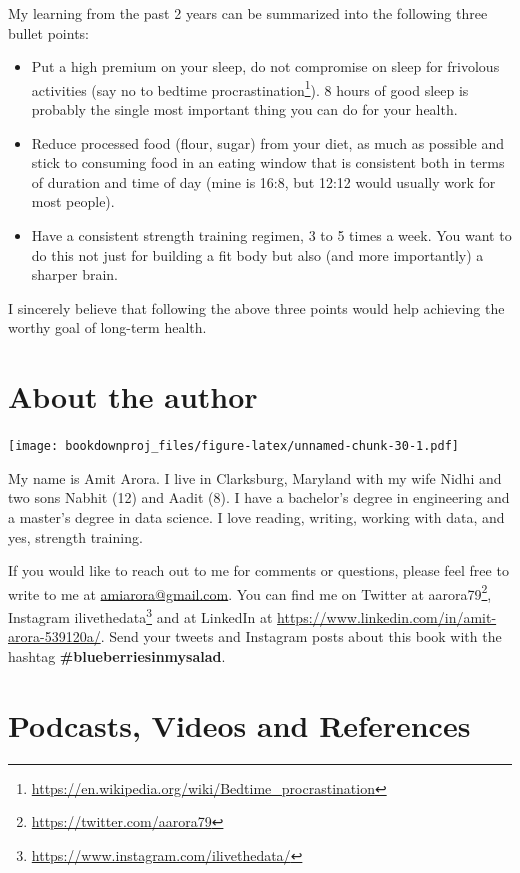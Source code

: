 \documentclass[
  oneside]{book}
\DeclareRobustCommand{\href}[2]{#2\footnote{\url{#1}}}
\begin{document}
My learning from the past 2 years can be summarized into the following three bullet points:

\begin{itemize}
\item
  Put a high premium on your sleep, do not compromise on sleep for frivolous activities (say no to \href{https://en.wikipedia.org/wiki/Bedtime_procrastination}{bedtime procrastination}). 8 hours of good sleep is probably the single most important thing you can do for your health.
\item
  Reduce processed food (flour, sugar) from your diet, as much as possible and stick to consuming food in an eating window that is consistent both in terms of duration and time of day (mine is 16:8, but 12:12 would usually work for most people).
\item
  Have a consistent strength training regimen, 3 to 5 times a week. You want to do this not just for building a fit body but also (and more importantly) a sharper brain.
\end{itemize}

I sincerely believe that following the above three points would help achieving the worthy goal of long-term health.

\hypertarget{about-the-author}{%
\chapter{About the author}\label{about-the-author}}

\texttt{[image: bookdownproj\_files/figure-latex/unnamed-chunk-30-1.pdf]}

My name is Amit Arora. I live in Clarksburg, Maryland with my wife Nidhi and two sons Nabhit (12) and Aadit (8). I have a bachelor's degree in engineering and a master's degree in data science. I love reading, writing, working with data, and yes, strength training.

If you would like to reach out to me for comments or questions, please feel free to write to me at \url{amiarora@gmail.com}. You can find me on Twitter at \href{https://twitter.com/aarora79}{aarora79}, Instagram \href{https://www.instagram.com/ilivethedata/}{ilivethedata} and at LinkedIn at \url{https://www.linkedin.com/in/amit-arora-539120a/}. Send your tweets and Instagram posts about this book with the hashtag \textbf{\#blueberriesinmysalad}.

\hypertarget{podcasts-videos-and-references}{%
\chapter{Podcasts, Videos and References}\label{podcasts-videos-and-references}}
\end{document}

